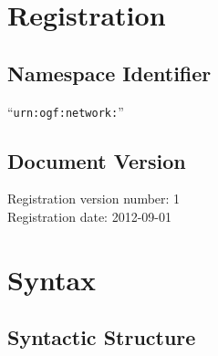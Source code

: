 \documentclass[12pt]{article}  %
\begin{document}
\newcommand{\qq}{\symbol{34}} %
\newcommand{\q}{\textquotesingle} %
\newcommand{\underscore}{\symbol{95}} %


\section{Registration}

\subsection{Namespace Identifier}

“\texttt{urn:ogf:network:}”

\subsection{Document Version}

Registration version number: 1 \\
Registration date: 2012-09-01  %

\section{Syntax}

\subsection{Syntactic Structure}
\end{document}
